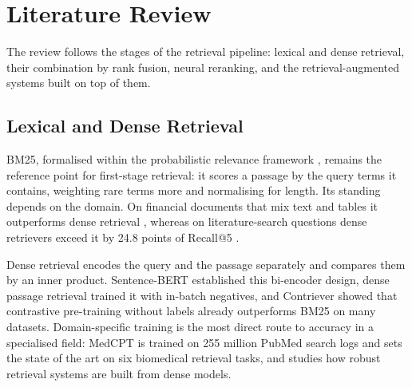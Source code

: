 \section{Literature Review}
\label{sec:literature}

The review follows the stages of the retrieval pipeline: lexical and dense retrieval, their
combination by rank fusion, neural reranking, and the retrieval-augmented systems built on top
of them.

\subsection{Lexical and Dense Retrieval}
\label{sec:lit-retrieval}

BM25, formalised within the probabilistic relevance framework \parencite{robertson2009bm25},
remains the reference point for first-stage retrieval: it scores a passage by the query terms
it contains, weighting rare terms more and normalising for length. Its standing depends on the
domain. On financial documents that mix text and tables it outperforms dense retrieval
\parencite{akarsu2026bm25}, whereas on literature-search questions dense retrievers exceed it by
24.8 points of Recall@5 \parencite{ajith2024litsearch}.

Dense retrieval encodes the query and the passage separately and compares them by an inner
product. Sentence-BERT \parencite{reimers2019sbert} established this bi-encoder design, dense
passage retrieval \parencite{karpukhin2020dpr} trained it with in-batch negatives, and
Contriever \parencite{izacard2022contriever} showed that contrastive pre-training without labels
already outperforms BM25 on many datasets. Domain-specific training is the most direct route to
accuracy in a specialised field: MedCPT \parencite{jin2023medcpt} is trained on 255 million
PubMed search logs and sets the state of the art on six biomedical retrieval tasks, and
\textcite{lin2024thesis} studies how robust retrieval systems are built from dense models.


